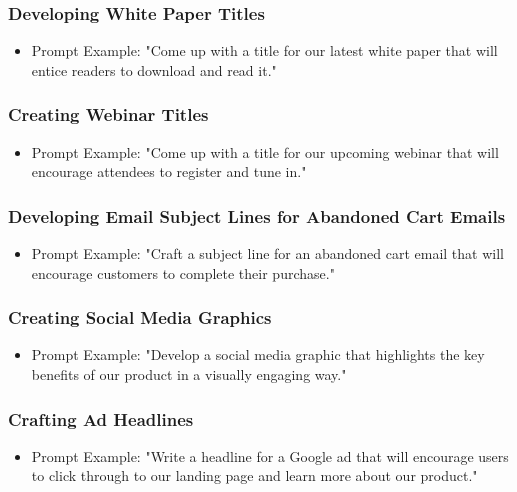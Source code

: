 \begin{frame}[fragile]\frametitle{Developing White Paper Titles}
\begin{itemize}
\item Prompt Example: "Come up with a title for our latest white paper that will entice readers to download and read it."
\end{itemize}
\end{frame}

\begin{frame}[fragile]\frametitle{Creating Webinar Titles}
\begin{itemize}
\item Prompt Example: "Come up with a title for our upcoming webinar that will encourage attendees to register and tune in."
\end{itemize}
\end{frame}

\begin{frame}[fragile]\frametitle{Developing Email Subject Lines for Abandoned Cart Emails}
\begin{itemize}
\item Prompt Example: "Craft a subject line for an abandoned cart email that will encourage customers to complete their purchase."
\end{itemize}
\end{frame}

\begin{frame}[fragile]\frametitle{Creating Social Media Graphics}
\begin{itemize}
\item Prompt Example: "Develop a social media graphic that highlights the key benefits of our product in a visually engaging way."
\end{itemize}
\end{frame}

\begin{frame}[fragile]\frametitle{Crafting Ad Headlines}
\begin{itemize}
\item Prompt Example: "Write a headline for a Google ad that will encourage users to click through to our landing page and learn more about our product."
\end{itemize}
\end{frame}


